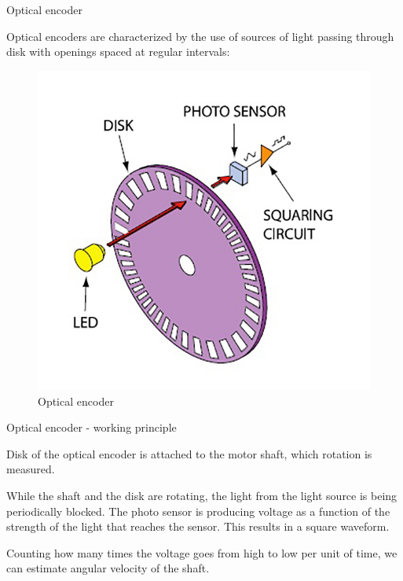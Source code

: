 \documentclass{beamer}
\begin{document}
\begin{frame}{Optical encoder}
	\begin{flushleft}
		
		Optical encoders are characterized by the use of sources of light passing through disk with openings spaced at regular intervals:
		
		\begin{figure}
			\centering
			\includegraphics[width=0.5\linewidth]{encoder1}
			\caption{Optical encoder}
			\label{fig:encoder1}
		\end{figure}
		
		
	\end{flushleft}
\end{frame}



\begin{frame}{Optical encoder - working principle}
	\begin{flushleft}
		
		Disk of the optical encoder is attached to the motor shaft, which rotation is measured. 
		
		\bigskip
		
		While the shaft and the disk are rotating, the light from the light source is being periodically blocked. The photo sensor is producing voltage as a function of the strength of the light that reaches the sensor. This results in a square waveform.
		
		\bigskip
		
		Counting how many times the voltage goes from high to low per unit of time, we can estimate angular velocity of the shaft.
		
	\end{flushleft}
\end{frame}
\end{document}
